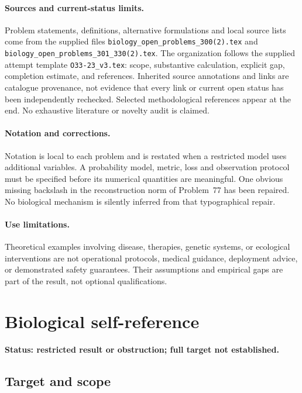 \documentclass[11pt]{article}
\begin{document}
\paragraph{Sources and current-status limits.}
Problem statements, definitions, alternative formulations and local source lists
come from the supplied files
\texttt{biology\_open\_problems\_300(2).tex} and
\texttt{biology\_open\_problems\_301\_330(2).tex}.
The organization follows the supplied attempt template
\texttt{O33-23\_v3.tex}: scope, substantive calculation, explicit gap,
completion estimate, and references. Inherited source annotations and links are
catalogue provenance, not evidence that every link or current open status has
been independently rechecked. Selected methodological references appear at the
end. No exhaustive literature or novelty audit is claimed.

\paragraph{Notation and corrections.}
Notation is local to each problem and is restated when a restricted model uses
additional variables. A probability model, metric, loss and observation protocol
must be specified before its numerical quantities are meaningful. One obvious
missing backslash in the reconstruction norm of Problem~77 has been repaired.
No biological mechanism is silently inferred from that typographical repair.

\paragraph{Use limitations.}
Theoretical examples involving disease, therapies, genetic systems, or ecological
interventions are not operational protocols, medical guidance, deployment advice,
or demonstrated safety guarantees. Their assumptions and empirical gaps are part
of the result, not optional qualifications.


\section*{Biological self-reference}
\label{prob:059}
\noindent\textbf{Status: restricted result or obstruction; full target not established.}
\subsection{Target and scope}
\end{document}
